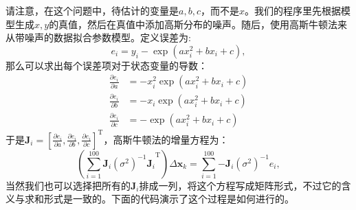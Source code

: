 请注意，在这个问题中，待估计的变量是$a,b,c$，而不是$x$。我们的程序里先根据模型生成$x,y$的真值，然后在真值中添加高斯分布的噪声。随后，使用高斯牛顿法来从带噪声的数据拟合参数模型。定义误差为:
\begin{equation}
e_i = y_i - \exp \left( {ax_i^2 + bx_i + c} \right),
\end{equation}
那么可以求出每个误差项对于状态变量的导数：
\begin{equation}
\begin{aligned}
\frac{{\partial {e_i}}}{{\partial a}} &=  - x_i^2\exp \left( {ax_i^2 + b{x_i} + c} \right)\\
\frac{{\partial e_i}}{{\partial b}} &=  - {x_i}\exp \left( {ax_i^2 + b{x_i} + c} \right)\\
\frac{{\partial {e_i}}}{{\partial c}} &=  - \exp \left( {ax_i^2 + b{x_i} + c} \right)
\end{aligned}
\end{equation}
于是$\bm{J}_i = \left[\frac{{\partial {e_i}}}{{\partial a}},\frac{{\partial {e_i}}}{{\partial b}},\frac{{\partial {e_i}}}{{\partial c}} \right]^\mathrm{T}$，高斯牛顿法的增量方程为：
\begin{equation}
\left(\sum\limits_{i = 1}^{100} {\bm{J}_i{(\sigma^2)^{ - 1}}{\bm{J}_i}}^\mathrm{T} \right) \Delta \bm{x}_k = \sum\limits_{i = 1}^{100} { - {\bm{J}_i}{(\sigma^2)^{ - 1}}{e_i}},
\end{equation}
当然我们也可以选择把所有的$\bm{J}_i$排成一列，将这个方程写成矩阵形式，不过它的含义与求和形式是一致的。下面的代码演示了这个过程是如何进行的。
